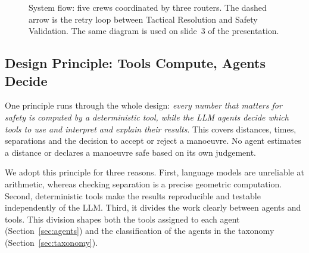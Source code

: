 \begin{figure}[!t]
{%
}
\caption{System flow: five crews coordinated by three routers. The dashed arrow is the retry loop between Tactical Resolution and Safety Validation. The same diagram is used on slide~3 of the presentation.}
\label{fig:flow}
\end{figure}

\subsection{Design Principle: Tools Compute, Agents Decide}\label{sec:principle}
One principle runs through the whole design: \emph{every number that matters for safety is computed by a deterministic tool, while the LLM agents decide which tools to use and interpret and explain their results}. This covers distances, times, separations and the decision to accept or reject a manoeuvre. No agent estimates a distance or declares a manoeuvre safe based on its own judgement.

We adopt this principle for three reasons. First, language models are unreliable at arithmetic, whereas checking separation is a precise geometric computation. Second, deterministic tools make the results reproducible and testable independently of the LLM. Third, it divides the work clearly between agents and tools. This division shapes both the tools assigned to each agent (Section~\ref{sec:agents}) and the classification of the agents in the taxonomy (Section~\ref{sec:taxonomy}).
